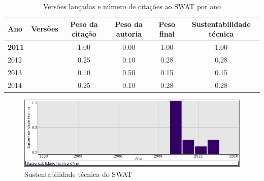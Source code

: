 \begin{table}[H]
\caption{Versões lançadas e número de citações ao SWAT por ano}
\centering
\begin{tabular}{| l | c | c | c | c | c |}
  \hline
  Ano & Versões & Peso da citação & Peso da autoria & Peso final & Sustentabilidade técnica \\
  \hline
            {\bf 2011}
          &
          
          &
          1.00
          &
          0.00
          &
          1.00
          &
            {\color{blue} 1.00}
          \\
\hline
            2012
          &
          
          &
          0.25
          &
          0.10
          &
          0.28
          &
            {\color{red} 0.28}
          \\
\hline
            2013
          &
          
          &
          0.10
          &
          0.50
          &
          0.15
          &
            {\color{red} 0.15}
          \\
\hline
            2014
          &
          
          &
          0.25
          &
          0.10
          &
          0.28
          &
            {\color{red} 0.28}
          \\
\hline
\end{tabular}
\end{table}

\begin{figure}[h]
  \center
  \includegraphics[scale=0.50]{result-documents/charts/swat.png}
  \caption{Sustentabilidade técnica do SWAT}
\end{figure}


